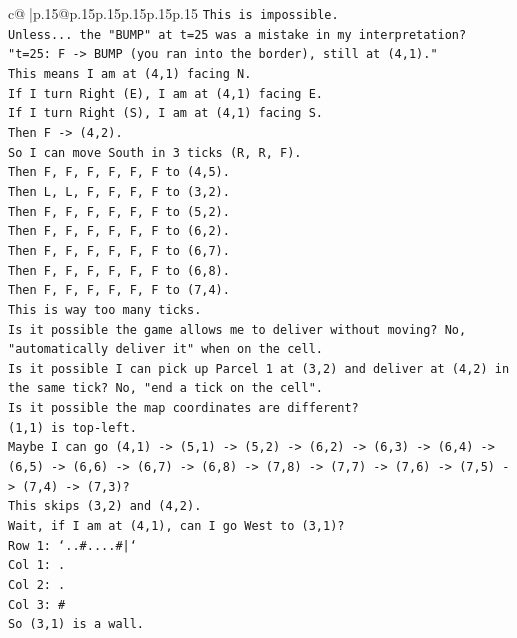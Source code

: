 \documentclass{article}
\begin{document}
{\begin{supertabular}{c@{$\;$}|p{.15\linewidth}@{}p{.15\linewidth}p{.15\linewidth}p{.15\linewidth}p{.15\linewidth}p{.15\linewidth}}
{{{\texttt{This is impossible.} \\
\texttt{Unless... the "BUMP" at t=25 was a mistake in my interpretation?} \\
\texttt{"t=25: F {-}> BUMP (you ran into the border), still at (4,1)."} \\
\texttt{This means I am at (4,1) facing N.} \\
\texttt{If I turn Right (E), I am at (4,1) facing E.} \\
\texttt{If I turn Right (S), I am at (4,1) facing S.} \\
\texttt{Then F {-}> (4,2).} \\
\texttt{So I can move South in 3 ticks (R, R, F).} \\
\texttt{Then F, F, F, F, F, F to (4,5).} \\
\texttt{Then L, L, F, F, F, F to (3,2).} \\
\texttt{Then F, F, F, F, F, F to (5,2).} \\
\texttt{Then F, F, F, F, F, F to (6,2).} \\
\texttt{Then F, F, F, F, F, F to (6,7).} \\
\texttt{Then F, F, F, F, F, F to (6,8).} \\
\texttt{Then F, F, F, F, F, F to (7,4).} \\
\texttt{This is way too many ticks.} \\
\texttt{Is it possible the game allows me to deliver without moving? No, "automatically deliver it" when on the cell.} \\
\texttt{Is it possible I can pick up Parcel 1 at (3,2) and deliver at (4,2) in the same tick? No, "end a tick on the cell".} \\
\texttt{Is it possible the map coordinates are different?} \\
\texttt{(1,1) is top{-}left.} \\
\texttt{Maybe I can go (4,1) {-}> (5,1) {-}> (5,2) {-}> (6,2) {-}> (6,3) {-}> (6,4) {-}> (6,5) {-}> (6,6) {-}> (6,7) {-}> (6,8) {-}> (7,8) {-}> (7,7) {-}> (7,6) {-}> (7,5) {-}> (7,4) {-}> (7,3)?} \\
\texttt{This skips (3,2) and (4,2).} \\
\texttt{Wait, if I am at (4,1), can I go West to (3,1)?} \\
\texttt{Row 1: `..\#....\#|`} \\
\texttt{Col 1: .} \\
\texttt{Col 2: .} \\
\texttt{Col 3: \#} \\
\texttt{So (3,1) is a wall.} \\
}}}
\end{supertabular}}
\end{document}
